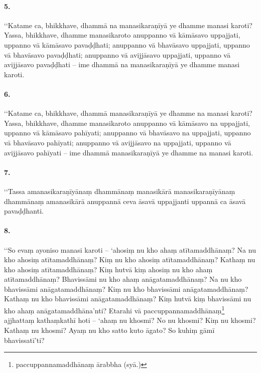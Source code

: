 \paragraph{5.} ‘‘Katame ca, bhikkhave, dhammā na manasikaraṇīyā ye dhamme manasi karoti? Yassa, bhikkhave, dhamme manasikaroto anuppanno vā kāmāsavo uppajjati, uppanno vā kāmāsavo pavaḍḍhati; anuppanno vā bhavāsavo uppajjati, uppanno vā bhavāsavo pavaḍḍhati; anuppanno vā avijjāsavo uppajjati, uppanno vā avijjāsavo pavaḍḍhati – ime dhammā na manasikaraṇīyā ye dhamme manasi karoti.

\paragraph{6.} ‘‘Katame ca, bhikkhave, dhammā manasikaraṇīyā ye dhamme na manasi karoti? Yassa, bhikkhave, dhamme manasikaroto anuppanno vā kāmāsavo na uppajjati, uppanno vā kāmāsavo pahīyati; anuppanno vā bhavāsavo na uppajjati, uppanno vā bhavāsavo pahīyati; anuppanno vā avijjāsavo na uppajjati, uppanno vā avijjāsavo pahīyati – ime dhammā manasikaraṇīyā ye dhamme na manasi karoti.

\paragraph{7.} ‘‘Tassa amanasikaraṇīyānaṃ dhammānaṃ manasikārā manasikaraṇīyānaṃ dhammānaṃ amanasikārā anuppannā ceva āsavā uppajjanti uppannā ca āsavā pavaḍḍhanti.

\paragraph{8.} ‘‘So evaṃ ayoniso manasi karoti – ‘ahosiṃ nu kho ahaṃ atītamaddhānaṃ? Na nu kho ahosiṃ atītamaddhānaṃ? Kiṃ nu kho ahosiṃ atītamaddhānaṃ? Kathaṃ nu kho ahosiṃ atītamaddhānaṃ? Kiṃ hutvā kiṃ ahosiṃ nu kho ahaṃ atītamaddhānaṃ? Bhavissāmi nu kho ahaṃ anāgatamaddhānaṃ? Na nu kho bhavissāmi anāgatamaddhānaṃ? Kiṃ nu kho bhavissāmi anāgatamaddhānaṃ? Kathaṃ nu kho bhavissāmi anāgatamaddhānaṃ? Kiṃ hutvā kiṃ bhavissāmi nu kho ahaṃ anāgatamaddhāna’nti? Etarahi vā paccuppannamaddhānaṃ\footnote{paccuppannamaddhānaṃ ārabbha (syā.)} ajjhattaṃ kathaṃkathī hoti – ‘ahaṃ nu khosmi? No nu khosmi? Kiṃ nu khosmi? Kathaṃ nu khosmi? Ayaṃ nu kho satto kuto āgato? So kuhiṃ gāmī bhavissatī’ti?

